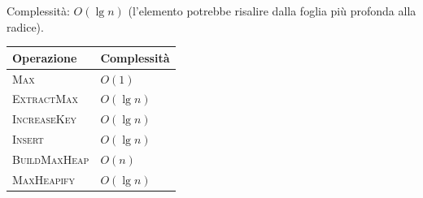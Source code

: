 Complessità: $O(\lg n)$ (l'elemento potrebbe risalire dalla foglia
più profonda alla radice).

\begin{center}
	\begin{tabular}{ll}
		\toprule
		\textbf{Operazione} & \textbf{Complessità} \\
		\midrule
		\textsc{Max}           & $O(1)$      \\
		\textsc{ExtractMax}    & $O(\lg n)$  \\
		\textsc{IncreaseKey}   & $O(\lg n)$  \\
		\textsc{Insert}        & $O(\lg n)$  \\
		\textsc{BuildMaxHeap}  & $O(n)$      \\
		\textsc{MaxHeapify}    & $O(\lg n)$  \\
		\bottomrule
	\end{tabular}
\end{center}

